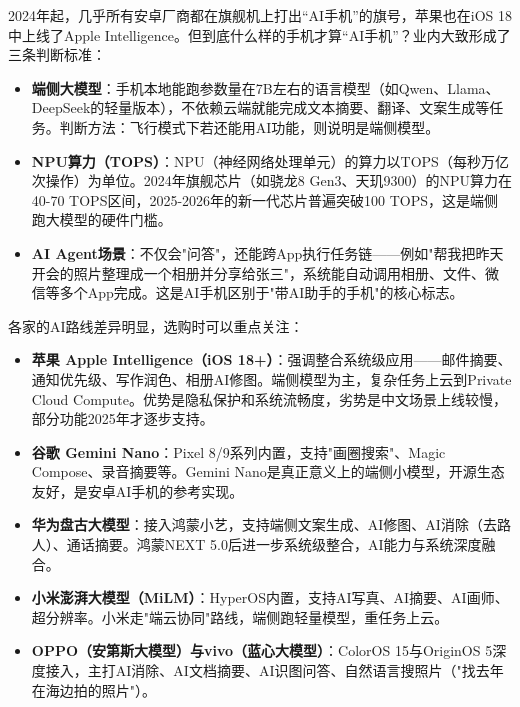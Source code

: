 


2024年起，几乎所有安卓厂商都在旗舰机上打出“AI手机”的旗号，苹果也在iOS 18中上线了Apple Intelligence。但到底什么样的手机才算“AI手机”？业内大致形成了三条判断标准：

\begin{itemize}
  \item \textbf{端侧大模型}：手机本地能跑参数量在7B左右的语言模型（如Qwen、Llama、DeepSeek的轻量版本），不依赖云端就能完成文本摘要、翻译、文案生成等任务。判断方法：飞行模式下若还能用AI功能，则说明是端侧模型。
  \item \textbf{NPU算力（TOPS）}：NPU（神经网络处理单元）的算力以TOPS（每秒万亿次操作）为单位。2024年旗舰芯片（如骁龙8 Gen3、天玑9300）的NPU算力在40-70 TOPS区间，2025-2026年的新一代芯片普遍突破100 TOPS，这是端侧跑大模型的硬件门槛。
  \item \textbf{AI Agent场景}：不仅会"问答"，还能跨App执行任务链——例如"帮我把昨天开会的照片整理成一个相册并分享给张三"，系统能自动调用相册、文件、微信等多个App完成。这是AI手机区别于"带AI助手的手机"的核心标志。
\end{itemize}


各家的AI路线差异明显，选购时可以重点关注：

\begin{itemize}
  \item \textbf{苹果 Apple Intelligence（iOS 18+）}：强调整合系统级应用——邮件摘要、通知优先级、写作润色、相册AI修图。端侧模型为主，复杂任务上云到Private Cloud Compute。优势是隐私保护和系统流畅度，劣势是中文场景上线较慢，部分功能2025年才逐步支持。
  \item \textbf{谷歌 Gemini Nano}：Pixel 8/9系列内置，支持"画圈搜索"、Magic Compose、录音摘要等。Gemini Nano是真正意义上的端侧小模型，开源生态友好，是安卓AI手机的参考实现。
  \item \textbf{华为盘古大模型}：接入鸿蒙小艺，支持端侧文案生成、AI修图、AI消除（去路人）、通话摘要。鸿蒙NEXT 5.0后进一步系统级整合，AI能力与系统深度融合。
  \item \textbf{小米澎湃大模型（MiLM）}：HyperOS内置，支持AI写真、AI摘要、AI画师、超分辨率。小米走"端云协同"路线，端侧跑轻量模型，重任务上云。
  \item \textbf{OPPO（安第斯大模型）与vivo（蓝心大模型）}：ColorOS 15与OriginOS 5深度接入，主打AI消除、AI文档摘要、AI识图问答、自然语言搜照片（"找去年在海边拍的照片"）。
\end{itemize}


